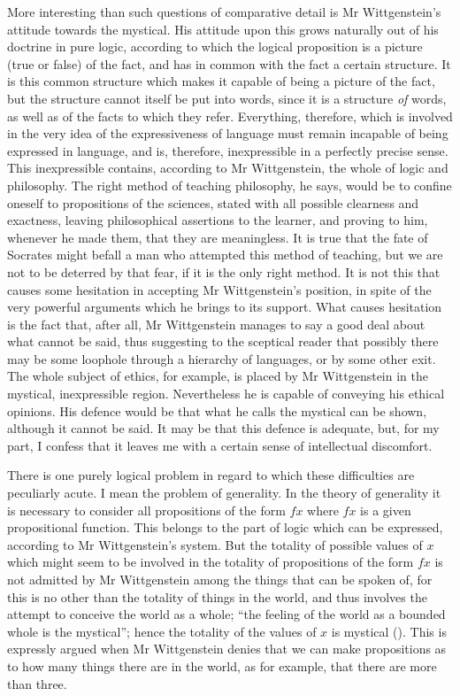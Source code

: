 More interesting than such questions of comparative
detail is Mr Wittgenstein's attitude towards the mystical.
His attitude upon this grows naturally out of his doctrine
in pure logic, according to which the logical proposition
is a picture (true or false) of the fact, and has in common
with the fact a certain structure. It is this common
structure which makes it capable of being a picture of
the fact, but the structure cannot itself be put into words,
since it is a structure \emph{of} words, as well as of the facts to
which they refer. Everything, therefore, which is involved
in the very idea of the expressiveness of language must
remain incapable of being expressed in language, and is,
therefore, inexpressible in a perfectly precise sense. This
inexpressible contains, according to Mr Wittgenstein, the
whole of logic and philosophy. The right method of
teaching philosophy, he says, would be to confine oneself
to propositions of the sciences, stated with all possible
clearness and exactness, leaving philosophical assertions
to the learner, and proving to him, whenever he made
them, that they are meaningless. It is true that the fate
of Socrates might befall a man who attempted this method
of teaching, but we are not to be deterred by that fear, if
it is the only right method. It is not this that causes
some hesitation in accepting Mr Wittgenstein's position,
in spite of the very powerful arguments which he brings
to its support. What causes hesitation is the fact that,
after all, Mr Wittgenstein manages to say a good deal
about what cannot be said, thus suggesting to the
sceptical reader that possibly there may be some loophole
through a hierarchy of languages, or by some other
exit. The whole subject of ethics, for example, is placed
by Mr Wittgenstein in the mystical, inexpressible region.
Nevertheless he is capable of conveying his ethical
opinions. His defence would be that what he calls the
mystical can be shown, although it cannot be said. It
may be that this defence is adequate, but, for my part,
I confess that it leaves me with a certain sense of
intellectual discomfort.

There is one purely logical problem in regard to
which these difficulties are peculiarly acute. I mean the
problem of generality. In the theory of generality it is
necessary to consider all propositions of the form $fx$ where
$fx$ is a given propositional function. This belongs to
the part of logic which can be expressed, according to
Mr Wittgenstein's system. But the totality of possible
values of $x$ which might seem to be involved in the totality
of propositions of the form $fx$ is not admitted by Mr
Wittgenstein among the things that can be spoken of,
for this is no other than the totality of things in the world,
and thus involves the attempt to conceive the world as a
whole; ``the feeling of the world as a bounded whole is
the mystical''; hence the totality of the values of $x$ is
mystical (). This is expressly argued when Mr
Wittgenstein denies that we can make propositions as
to how many things there are in the world, as for example,
that there are more than three.

